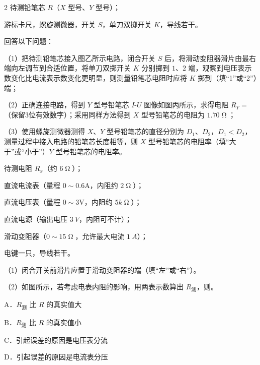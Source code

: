 \documentclass[fontset=none]{ctexart}
\begin{document}
\begin{multicols}{2}
待测铅笔芯 $R$（$X$ 型号、$Y$ 型号）；

游标卡尺，螺旋测微器，开关 $S$，单刀双掷开关 $K$，导线若干。

回答以下问题：

（1）把待测铅笔芯接入图乙所示电路，闭合开关 $S$ 后，将滑动变阻器滑片由最右端向左调节到合适位置，将单刀双掷开关 $K$ 分别掷到 $1$、$2$ 端，观察到电压表示数变化比电流表示数变化更明显，则测量铅笔芯电阻时应将 $K$ 掷到\kongbai（填“1”或“2”）端；

（2）正确连接电路，得到 $Y$ 型号铅笔芯 $I$-$U$ 图像如图丙所示，求得电阻 $R_{Y}=$\kongbai\unit{\upOmega}（保留3位有效数字）；采用同样方法得到 $X$ 型号铅笔芯的电阻为 $\unit{1.70\upOmega}$；


（3）使用螺旋测微器测得 $X$、$Y$ 型号铅笔芯的直径分别为 $D_{1}$、$D_{2}$，$D_{1}<D_{2}$，测量过程中接入电路的铅笔芯长度相等，则 $X$ 型号铅笔芯的电阻率\kongbai（填“大于”或“小于”）$Y$ 型号铅笔芯的电阻率。


待测电阻 $R_{x}$（约 $\unit{6\upOmega}$）；

直流电流表（量程 $0\sim0.6$\unit{A}，内阻约 $\unit{2\upOmega}$）；

直流电压表（量程 $0\sim3$\unit{V}，内阻约 $\unit{5k\upOmega}$）；

直流电源（输出电压 $\unit{3\ V}$，内阻可不计）；

滑动变阻器（$0\sim15\unit{\upOmega}$，允许最大电流 $\unit{1\ A}$）；

电键一只，导线若干。


（1）闭合开关前滑片应置于滑动变阻器的\kongbai{}端（填“左”或“右”）。

（2）如图所示，若考虑电表内阻的影响，用两表示数算出 $R_{\text{测}}$，则\kongbai。

\bindopt A．$R_{\text{测}}$ 比 $R$ 的真实值大\par
\bindopt B．$R_{\text{测}}$ 比 $R$ 的真实值小\par
\bindopt C．引起误差的原因是电压表分流\par
\bindopt D．引起误差的原因是电流表分压\par



\end{multicols}
\end{document}
